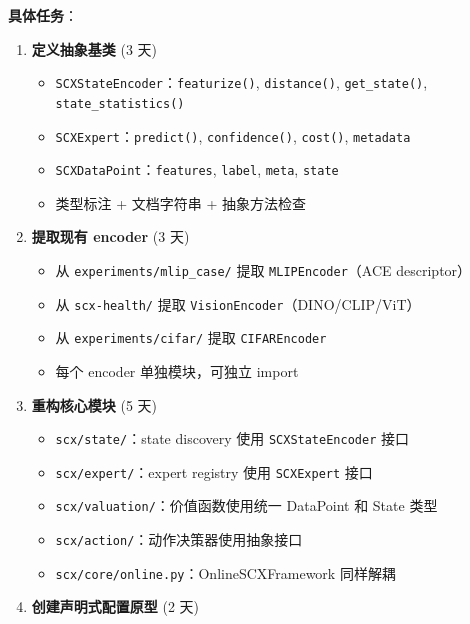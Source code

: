\documentclass[
  12pt,
]{ctexart}
\providecommand{\tightlist}{%
  \setlength{\itemsep}{0pt}\setlength{\parskip}{0pt}}
\begin{document}
\textbf{具体任务}：

\begin{enumerate}
\def\labelenumi{\arabic{enumi}.}
\tightlist
\item
  \textbf{定义抽象基类} (3 天)

  \begin{itemize}
  \tightlist
  \item
    \texttt{SCXStateEncoder}：\texttt{featurize()}, \texttt{distance()},
    \texttt{get\_state()}, \texttt{state\_statistics()}
  \item
    \texttt{SCXExpert}：\texttt{predict()}, \texttt{confidence()},
    \texttt{cost()}, \texttt{metadata}
  \item
    \texttt{SCXDataPoint}：\texttt{features}, \texttt{label},
    \texttt{meta}, \texttt{state}
  \item
    类型标注 + 文档字符串 + 抽象方法检查
  \end{itemize}
\item
  \textbf{提取现有 encoder} (3 天)

  \begin{itemize}
  \tightlist
  \item
    从 \texttt{experiments/mlip\_case/} 提取 \texttt{MLIPEncoder}（ACE
    descriptor）
  \item
    从 \texttt{scx-health/} 提取 \texttt{VisionEncoder}（DINO/CLIP/ViT）
  \item
    从 \texttt{experiments/cifar/} 提取 \texttt{CIFAREncoder}
  \item
    每个 encoder 单独模块，可独立 import
  \end{itemize}
\item
  \textbf{重构核心模块} (5 天)

  \begin{itemize}
  \tightlist
  \item
    \texttt{scx/state/}：state discovery 使用 \texttt{SCXStateEncoder}
    接口
  \item
    \texttt{scx/expert/}：expert registry 使用 \texttt{SCXExpert} 接口
  \item
    \texttt{scx/valuation/}：价值函数使用统一 DataPoint 和 State 类型
  \item
    \texttt{scx/action/}：动作决策器使用抽象接口
  \item
    \texttt{scx/core/online.py}：OnlineSCXFramework 同样解耦
  \end{itemize}
\item
  \textbf{创建声明式配置原型} (2 天)


\end{enumerate}
\end{document}
